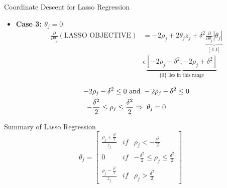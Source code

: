 \documentclass{beamer}
\begin{document}
\begin{frame}{Coordinate Descent for Lasso Regression}
\begin{itemize}
    \item \textbf{Case 3: $\theta_{j} = 0$}
    \begin{align*}
    \frac{\partial}{\partial \theta_{j}}(\text {LASSO OBJECTIVE})&=-2 \rho_{j}+2\theta_{j} z_{j}+ \delta^{2}\underbrace{{\frac{\partial}{\partial \theta_{j}}}\left|\theta_{j}\right|}_{\text{[-1,1]}}\\
    &\epsilon \underbrace{[-2\rho_{j} - \delta^{2}, -2\rho_{j} + \delta^{2}]}_{\text{$\{0\}$ lies in this range}}\\
    \end{align*}
    \begin{align*}
    -2\rho_{j} - \delta^{2} \leq 0 \text{ and }& -2\rho_{j} - \delta^{2} \leq 0\\
    -\frac{\delta^{2}}{2} \leq \rho_j \leq \frac{\delta^{2}}{2}  \Rightarrow & \hspace{2mm} \theta_{j}=0
    \end{align*}
    
\end{itemize}
    
\end{frame}
\begin{frame}{Summary of Lasso Regression}
\begin{equation}
\theta_{j} =\left[\begin{array}{ccc}
{\frac{\rho_{j} + \frac{\delta^{2}}{2}}{z_{j}}} & {if}  & {\rho_{j}<-\frac{\delta^{2}}{2}} \\
{0} & {if} & {-\frac{\delta^{2}}{2} \leq \rho_{j} \leq \frac{\delta^{2}}{2}} \\
{\frac{\rho_{j} - \frac{\delta^{2}}{2}}{z_{j}}} & {i f} & {\rho_{j}>\frac{\delta^{2}}{2}}
\end{array}\right]
\end{equation}
    
\end{frame}
\end{document}
